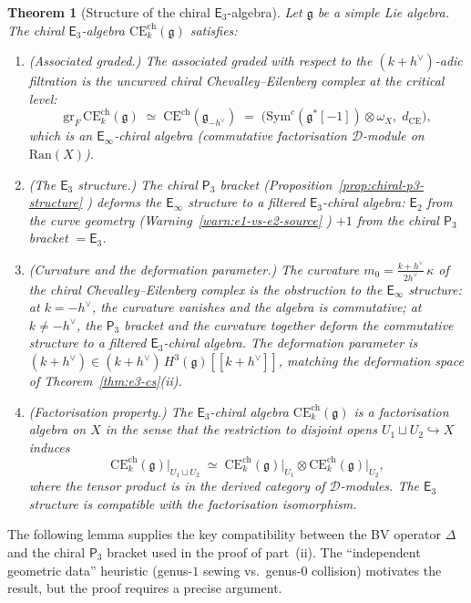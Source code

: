 \documentclass[11pt,reqno]{amsart}
\newtheorem{theorem}{Theorem}[section]
\theoremstyle{definition}
\theoremstyle{remark}
\newcommand{\cD}{\mathcal{D}}
\newcommand{\Ran}{\mathrm{Ran}}
\newcommand{\CE}{\mathrm{CE}}
\newcommand{\Etwo}{\mathsf{E}_{2}}
\newcommand{\Ethree}{\mathsf{E}_{3}}
\newcommand{\Einf}{\mathsf{E}_{\infty}}
\newcommand{\Pthree}{\mathsf{P}_{3}}
\newcommand{\Sym}{\mathrm{Sym}}
\newcommand{\fg}{\mathfrak{g}}
\numberwithin{equation}{section}
\begin{document}
\begin{theorem}[Structure of the chiral $\Ethree$-algebra]
\label{thm:chiral-e3-structure}
Let $\fg$ be a simple Lie algebra.
The chiral $\Ethree$-algebra
$\CE^{\mathrm{ch}}_k(\fg)$ satisfies:
\begin{enumerate}[label=\textup{(\roman*)}]
\item \textup{(Associated graded.)}
  The associated graded with respect to the $(k+h^\vee)$-adic
  filtration is the uncurved chiral Chevalley--Eilenberg
  complex at the critical level:
  \begin{equation}\label{eq:assoc-graded}
    \mathrm{gr}_F\,\CE^{\mathrm{ch}}_k(\fg)
    \;\simeq\;
    \CE^{\mathrm{ch}}(\fg_{-h^\vee})
    \;=\;
    \bigl(\Sym^c(\fg^*[-1]) \otimes \omega_X,\; d_{\CE}\bigr),
  \end{equation}
  which is an $\Einf$-chiral algebra \textup{(}commutative
  factorisation $\cD$-module on $\Ran(X)$\textup{)}.
\item \textup{(The $\Ethree$ structure.)}
  The chiral $\Pthree$ bracket
  \textup{(}Proposition~\textup{\ref{prop:chiral-p3-structure}}%
  \textup{)} deforms the $\Einf$ structure to
  a filtered $\Ethree$-chiral algebra:
  $\Etwo$ from the curve geometry
  \textup{(}Warning~\textup{\ref{warn:e1-vs-e2-source}}%
  \textup{)} $+ 1$ from the chiral $\Pthree$ bracket
  $= \Ethree$.
\item \textup{(Curvature and the deformation parameter.)}
  The curvature
  $m_0 = \tfrac{k + h^\vee}{2h^\vee}\,\kappa$ of the chiral
  Chevalley--Eilenberg complex is the obstruction to the
  $\Einf$ structure: at $k = -h^\vee$, the curvature vanishes
  and the algebra is commutative; at $k \neq -h^\vee$, the
  $\Pthree$ bracket and the curvature together deform the
  commutative structure to a filtered $\Ethree$-chiral
  algebra.
  The deformation parameter is $(k+h^\vee) \in
  (k+h^\vee)\,H^3(\fg)[[k+h^\vee]]$,
  matching the deformation space of
  Theorem~\textup{\ref{thm:e3-cs}(ii)}.
\item \textup{(Factorisation property.)}
  The $\Ethree$-chiral algebra
  $\CE^{\mathrm{ch}}_k(\fg)$ is a factorisation algebra on
  $X$ in the sense that the restriction to disjoint
  opens $U_1 \sqcup U_2 \hookrightarrow X$ induces
  \begin{equation}\label{eq:factorisation}
    \CE^{\mathrm{ch}}_k(\fg)\big|_{U_1 \sqcup U_2}
    \;\simeq\;
    \CE^{\mathrm{ch}}_k(\fg)\big|_{U_1}
    \otimes
    \CE^{\mathrm{ch}}_k(\fg)\big|_{U_2},
  \end{equation}
  where the tensor product is in the derived category of
  $\cD$-modules. The $\Ethree$ structure is compatible with
  the factorisation isomorphism.
\end{enumerate}
\end{theorem}
The following lemma supplies the key compatibility between
the BV operator $\Delta$ and the chiral $\Pthree$ bracket
used in the proof of part~(ii). The ``independent
geometric data'' heuristic (genus-$1$ sewing vs.\
genus-$0$ collision) motivates the result, but
the proof requires a precise argument.
\end{document}
